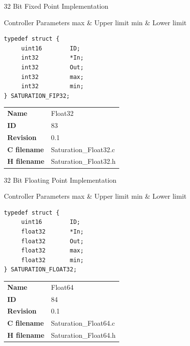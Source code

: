 32 Bit Fixed Point Implementation

\begin{XtoCtabular}{Controller Parameters}
max & Upper limit\tabularnewline
\hline
min & Lower limit\tabularnewline
\hline
\end{XtoCtabular}

\begin{lstlisting}
typedef struct {
     uint16        ID;
     int32         *In;
     int32         Out;
     int32         max;
     int32         min;
} SATURATION_FIP32;
\end{lstlisting}

\ifdefined \AddTestReports
{}
\fi
{}
\nopagebreak[0]
\begin{tabular}{l l}
\textbf{Name} & Float32 \tabularnewline
\textbf{ID} & 83 \tabularnewline
\textbf{Revision} & 0.1 \tabularnewline
\textbf{C filename} & Saturation\_Float32.c \tabularnewline
\textbf{H filename} & Saturation\_Float32.h \tabularnewline
\end{tabular}
\vspace{1ex}

32 Bit Floating Point Implementation

\begin{XtoCtabular}{Controller Parameters}
max & Upper limit\tabularnewline
\hline
min & Lower limit\tabularnewline
\hline
\end{XtoCtabular}

\begin{lstlisting}
typedef struct {
     uint16        ID;
     float32       *In;
     float32       Out;
     float32       max;
     float32       min;
} SATURATION_FLOAT32;
\end{lstlisting}

\ifdefined \AddTestReports
{}
\fi
{}
\nopagebreak[0]
\begin{tabular}{l l}
\textbf{Name} & Float64 \tabularnewline
\textbf{ID} & 84 \tabularnewline
\textbf{Revision} & 0.1 \tabularnewline
\textbf{C filename} & Saturation\_Float64.c \tabularnewline
\textbf{H filename} & Saturation\_Float64.h \tabularnewline
\end{tabular}
\vspace{1ex}

